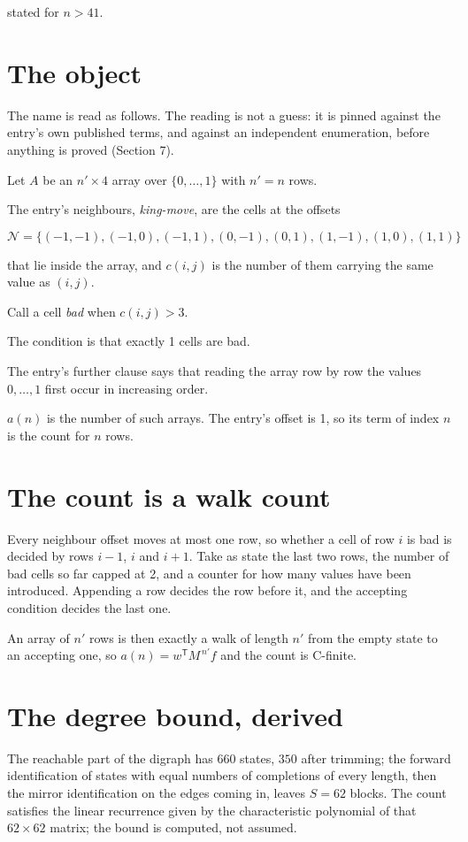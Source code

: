 \documentclass[11pt]{article}
\theoremstyle{definition}
\begin{document}
stated for $n > 41$.

\section{The object}

The name is read as follows. The reading is not a guess: it is pinned against the entry's own published terms, and against an independent enumeration, before anything is proved (Section 7).

Let $A$ be an $n' \times 4$ array over $\{0,\dots,1\}$ with $n' = n$ rows.

The entry's neighbours, {\itshape king-move}, are the cells at the offsets

\[\mathcal{N} = \{(-1,-1), (-1,0), (-1,1), (0,-1), (0,1), (1,-1), (1,0), (1,1)\}\]

that lie inside the array, and $c(i,j)$ is the number of them carrying the same value as $(i,j)$.

Call a cell {\itshape bad} when $c(i,j) > 3$.

The condition is that exactly 1 cells are bad.

The entry's further clause says that reading the array row by row the values $0,\dots,1$ first occur in increasing order.

$a(n)$ is the number of such arrays. The entry's offset is 1, so its term of index $n$ is the count for $n$ rows.

\section{The count is a walk count}

Every neighbour offset moves at most one row, so whether a cell of row $i$ is bad is decided by rows $i-1$, $i$ and $i+1$. Take as state the last two rows, the number of bad cells so far capped at 2, and a counter for how many values have been introduced. Appending a row decides the row before it, and the accepting condition decides the last one.

An array of $n'$ rows is then exactly a walk of length $n'$ from the empty state to an accepting one, so $a(n) = w^{\mathsf T}M^{\,n'}f$ and the count is C-finite.

\section{The degree bound, derived}

The reachable part of the digraph has $660$ states, $350$ after trimming; the forward identification of states with equal numbers of completions of every length, then the mirror identification on the edges coming in, leaves $S = 62$ blocks. The count satisfies the linear recurrence given by the characteristic polynomial of that $62\times62$ matrix; the bound is computed, not assumed.
\end{document}
